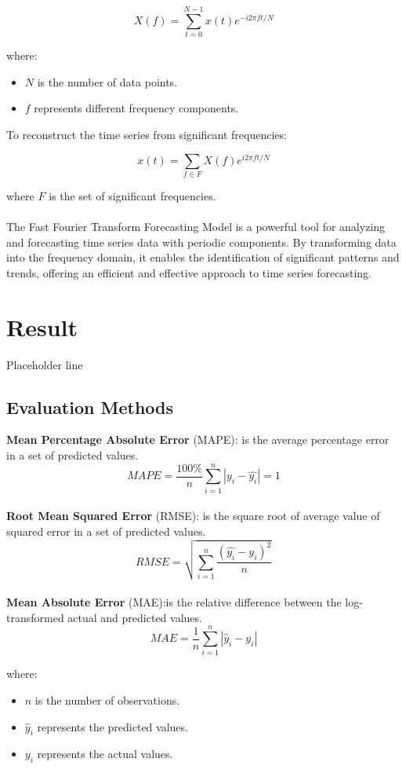 \documentclass{ieeeojies}
\begin{document}
\[
X(f) = \sum_{t=0}^{N-1} x(t) e^{-i 2\pi ft / N}
\]

where:
\begin{itemize}
    \item \( N \) is the number of data points.
    \item \( f \) represents different frequency components.
\end{itemize}
To reconstruct the time series from significant frequencies:

\[
x(t) = \sum_{f \in F} X(f) e^{i 2\pi ft / N}
\]

where \( F \) is the set of significant frequencies.
\\\\
The Fast Fourier Transform Forecasting Model is a powerful tool for analyzing and forecasting time series data with periodic components. By transforming data into the frequency domain, it enables the identification of significant patterns and trends, offering an efficient and effective approach to time series forecasting.
\section{Result}
Placeholder line
\subsection{Evaluation Methods}
\textbf{Mean Percentage Absolute Error} (MAPE): is the average percentage error in a set of predicted values.\\
\[MAPE=\frac{100\%}{n}  \sum_{i=1}^{n} |y_i-\hat{y_i} |  = 1 \]\\
\textbf{Root Mean Squared Error} (RMSE): is the square root of average value of squared error in a set of predicted values.\\
\[RMSE=\sqrt{\sum_{i=1}^{n} \frac{(\hat{y_i}-y_i )^2}{n} }\]\\
\textbf{Mean Absolute Error} (MAE):is the relative difference between the log-transformed actual and predicted values.\\
\[
MAE = \frac{1}{n} \sum_{i=1}^{n} \left| \hat{y}_i - y_i \right|
\]

where:
\begin{itemize}
    \item \(n\) is the number of observations.
    \item \(\hat{y}_i\) represents the predicted values.
    \item \(y_i\) represents the actual values.
\end{itemize}
\end{document}
